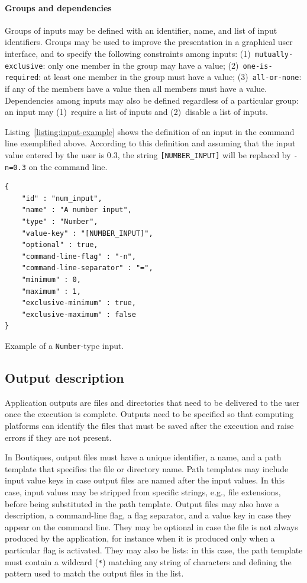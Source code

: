 \documentclass[a4paper,num-refs]{oup-contemporary}
\newcommand{\boutiques}{Boutiques\xspace}
\begin{document}
\paragraph{Groups and dependencies} Groups of inputs may be defined
with an identifier, name, and list of input identifiers. Groups may be
used to improve the presentation in a graphical user interface, and to
specify the following constraints among inputs:
(1)~\texttt{mutually-exclusive}: only one member in the group may have
a value; (2)~\texttt{one-is-required}: at least one member in the
group must have a value; (3)~\texttt{all-or-none}: if any of the
members have a value then all members must have a value. Dependencies among
inputs may also be defined regardless of a particular group: an input
may (1)~require a list of inputs and (2)~disable a list of inputs.

Listing~\ref{listing:input-example} shows the definition of an input in the
command line exemplified above. According to this definition and assuming
that the input value entered by the user is 0.3, the string
\texttt{[NUMBER\_INPUT]} will be replaced by \texttt{-n=0.3} on the command
line.
\begin{listing}
\begin{verbatim}
{
    "id" : "num_input",
    "name" : "A number input",
    "type" : "Number",
    "value-key" : "[NUMBER_INPUT]",
    "optional" : true,
    "command-line-flag" : "-n",
    "command-line-separator" : "=",
    "minimum" : 0,
    "maximum" : 1,
    "exclusive-minimum" : true,
    "exclusive-maximum" : false
}
\end{verbatim}
\caption{Example of a \texttt{Number}-type input.} 
\label{listing:input-example}
\end{listing}

\subsection{Output description}

Application outputs are files and directories that need to be
delivered to the user once the execution is
complete. Outputs need to be specified so that computing platforms can
identify the files that must be saved after the execution and raise
errors if they are not present.

In \boutiques, output files must have a unique identifier, a name, and
a path template that specifies the file or directory name. Path
templates may include input value keys in case output files are named
after the input values. In this case, input values may be stripped
from specific strings, e.g., file extensions, before being substituted
in the path template. Output files may also have a description, a
command-line flag, a flag separator, and a value key in case they
appear on the command line. They may be optional in case the file is
not always produced by the application, for instance when it is
produced only when a particular flag is activated. They may also be
lists: in this case, the path template must contain a
wildcard (\texttt{*}) matching any string of characters and defining
the pattern used to match the output files in the list.
\end{document}
